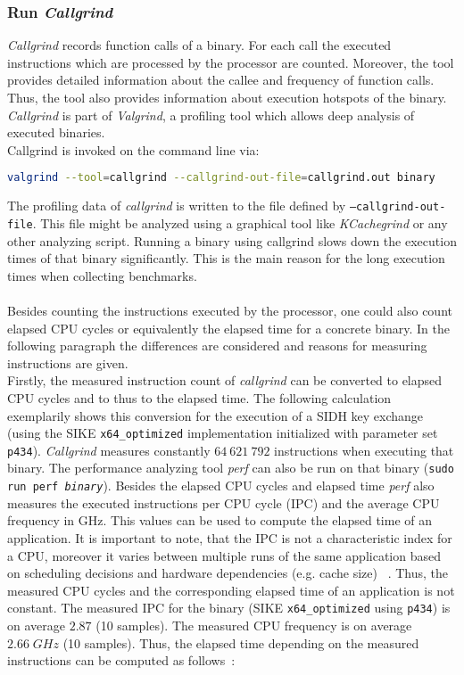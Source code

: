 \subsubsection{Run \textit{Callgrind}}
\textit{Callgrind} records function calls of a binary. For each call the executed instructions which are processed by the processor are counted. Moreover, the tool provides detailed information about the callee and frequency of function calls. Thus, the tool also provides information about execution hotspots of the binary. \textit{Callgrind} is part of \textit{Valgrind}, a profiling tool which allows deep analysis of executed binaries.\\
Callgrind is invoked on the command line via:
\begin{lstlisting}[language=Bash]
valgrind --tool=callgrind --callgrind-out-file=callgrind.out binary
\end{lstlisting}
The profiling data of \textit{callgrind} is written to the file defined by \texttt{--callgrind-out-file}. This file might be analyzed using a graphical tool like \textit{KCachegrind} or any other analyzing script.
Running a binary using callgrind slows down the execution times of that binary significantly. This is the main reason for the long execution times when collecting benchmarks. \\\\
Besides counting the instructions executed by the processor, one could also count elapsed \gls{CPU} cycles or equivalently the elapsed time for a concrete binary. In the following paragraph the differences are considered and reasons for measuring instructions are given.
\\
Firstly, the measured instruction count of \textit{callgrind} can be converted to elapsed \gls{CPU} cycles and to thus to the elapsed time. The following calculation exemplarily shows this conversion for the execution of a SIDH key exchange (using the \gls{SIKE} \texttt{x64\_optimized} implementation initialized with parameter set \texttt{p434}). \textit{Callgrind} measures constantly $64\:621\:792$ instructions when executing that binary. The performance analyzing tool \textit{perf} can also be run on that binary (\texttt{sudo run perf \textit{binary}}). Besides the elapsed \gls{CPU} cycles and elapsed time \textit{perf} also measures the executed instructions per \gls{CPU} cycle (\gls{IPC}) and the average \gls{CPU} frequency in GHz. This values can be used to compute the elapsed time of an application. It is important to note, that the \gls{IPC} is not a characteristic index for a \gls{CPU}, moreover it varies between multiple runs of the same application based on scheduling decisions and hardware dependencies (e.g. cache size) ~\parencite{alameldeen2006ipc}. Thus, the measured \gls{CPU} cycles and the corresponding elapsed time of an application is not constant. The measured \gls{IPC} for the binary (\gls{SIKE} \texttt{x64\_optimized} using \texttt{p434}) is on average $2.87$ (10 samples). The measured \gls{CPU} frequency is on average $2.66\;GHz$ (10 samples). Thus, the elapsed time depending on the measured instructions can be computed as follows~\parencite{alameldeen2006ipc}:


